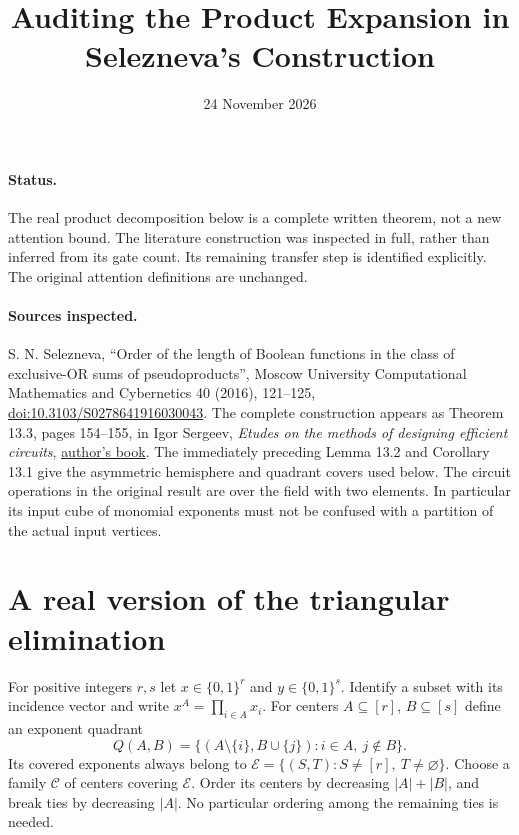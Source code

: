 \documentclass[11pt]{article}
\title{Auditing the Product Expansion in Selezneva's Construction}
\author{}
\date{24 November 2026}
\begin{document}
\maketitle

\paragraph{Status.}
The real product decomposition below is a complete written theorem, not a
new attention bound. The literature construction was inspected in full,
rather than inferred from its gate count. Its remaining transfer step
is identified explicitly. The original attention definitions are unchanged.

\paragraph{Sources inspected.}
S. N. Selezneva, ``Order of the length of Boolean functions in the class of
exclusive-OR sums of pseudoproducts'', Moscow University Computational
Mathematics and Cybernetics 40 (2016), 121--125,
\href{https://doi.org/10.3103/S0278641916030043}{doi:10.3103/S0278641916030043}.
The complete construction appears as Theorem 13.3, pages 154--155, in
Igor Sergeev, \emph{Etudes on the methods of designing efficient circuits},
\href{https://igorssergeev.github.io/papers/S-book_eng_280525.pdf}{author's book}.
The immediately preceding Lemma 13.2 and Corollary 13.1 give the
asymmetric hemisphere and quadrant covers used below. The circuit
operations in the original result are over the field with two elements.
In particular its input cube of monomial exponents must not be confused
with a partition of the actual input vertices.

\section*{A real version of the triangular elimination}
For positive integers $r,s$ let $x\in\{0,1\}^r$ and
$y\in\{0,1\}^s$. Identify a subset with its incidence vector and write
$x^A=\prod_{i\in A}x_i$. For centers $A\subseteq[r]$, $B\subseteq[s]$
define an exponent quadrant
\[
 Q(A,B)=\{(A\setminus\{i\},B\cup\{j\}):i\in A,\ j\notin B\}.
\]
Its covered exponents always belong to
$\mathcal E=\{(S,T):S\ne[r],\ T\ne\varnothing\}$.
Choose a family $\mathcal C$ of centers covering $\mathcal E$.
Order its centers by decreasing $|A|+|B|$, and break ties by
decreasing $|A|$. No particular ordering among the remaining ties is needed.
\end{document}
